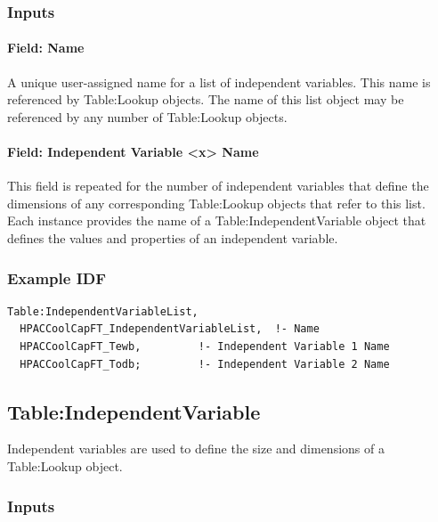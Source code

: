 \subsubsection{Inputs}\label{inputs-1}

\paragraph{Field: Name}

A unique user-assigned name for a list of independent variables. This
name is referenced by Table:Lookup objects. The name of this list object
may be referenced by any number of Table:Lookup objects.

\paragraph{Field: Independent Variable \textless{}x\textgreater{}
Name}\label{field-independent-variable-x-name}

This field is repeated for the number of independent variables that
define the dimensions of any corresponding Table:Lookup objects that
refer to this list. Each instance provides the name of a
Table:IndependentVariable object that defines the values and properties
of an independent variable.

\subsubsection{Example IDF}\label{example-idf-1}

\begin{lstlisting}
Table:IndependentVariableList,
  HPACCoolCapFT_IndependentVariableList,  !- Name
  HPACCoolCapFT_Tewb,         !- Independent Variable 1 Name
  HPACCoolCapFT_Todb;         !- Independent Variable 2 Name
\end{lstlisting}

\subsection{Table:IndependentVariable}\label{tableindependentvariable}

Independent variables are used to define the size and dimensions of a
Table:Lookup object.

\subsubsection{Inputs}\label{inputs-2}


